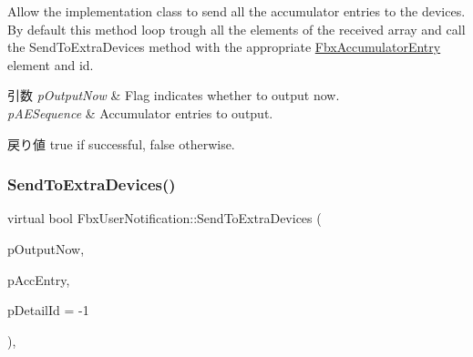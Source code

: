 Allow the implementation class to send all the accumulator entries to the devices. By default this method loop trough all the elements of the received array and call the Send\+To\+Extra\+Devices method with the appropriate \hyperlink{class_fbx_accumulator_entry}{Fbx\+Accumulator\+Entry} element and id. 
\begin{DoxyParams}{引数}
{\em p\+Output\+Now} & Flag indicates whether to output now. \\
\hline
{\em p\+A\+E\+Sequence} & Accumulator entries to output. \\
\hline
\end{DoxyParams}
\begin{DoxyReturn}{戻り値}
{\ttfamily true} if successful, {\ttfamily false} otherwise. 
\end{DoxyReturn}
\mbox{\label{class_fbx_user_notification_a34a14bfbded4d19df3d3da02d9ec38b7}} 
\subsubsection{\texorpdfstring{Send\+To\+Extra\+Devices()}{SendToExtraDevices()}\hspace{0.1cm}{\footnotesize\ttfamily [3/3]}}
{\footnotesize\ttfamily virtual bool Fbx\+User\+Notification\+::\+Send\+To\+Extra\+Devices (\begin{DoxyParamCaption}\item[{bool}]{p\+Output\+Now,  }\item[{const \hyperlink{class_fbx_accumulator_entry}{Fbx\+Accumulator\+Entry} $\ast$}]{p\+Acc\+Entry,  }\item[{int}]{p\+Detail\+Id = {\ttfamily -\/1} }\end{DoxyParamCaption})\hspace{0.3cm}{\ttfamily [protected]}, {\ttfamily [virtual]}}

